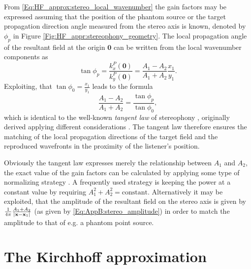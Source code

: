From \eqref{Eq:HF_approx:stereo_local_wavenumber} the gain factors may be expressed assuming that the position of the phantom source or the target propagation direction angle measured from the stereo axis is known, denoted by $\phi_p$ in Figure \eqref{Fig:HF_appr:stereophony_geometry}.
The local propagation angle of the resultant field at the origin $\mathbf{0}$ can be written from the local wavenumber components as
\begin{equation}
\tan \phi_p = \frac{k_x^P(\mathbf{0})}{k_y^P(\mathbf{0})} = \frac{A_1-A_2}{A_1+A_2}\frac{x_1}{y_1}.
\end{equation}
Exploiting, that $\tan \phi_0 = \frac{x_1}{y_1}$ leads to the formula
\begin{equation}
\frac{A_1 - A_2}{A_1 + A_2} = \frac{\tan \phi_p}{\tan \phi_0},
\end{equation}
which is identical to the well-known \emph{tangent law} of stereophony \cite{SpringerHandbookSpeech2008, Pulkki1997, Pulkki2001a, Pulkki2001:phd}, originally derived applying different considerations \cite{Bennett1985}.
The tangent law therefore ensures the matching of the local propagation directions of the target field and the reproduced wavefronts in the proximity of the listener's position.

Obviously the tangent law expresses merely the relationship between $A_1$ and $A_2$, the exact value of the gain factors can be calculated by applying some type of normalizing strategy \cite{Moore1990}.
A frequently used strategy is keeping the power at a constant value by requiring $A_1^2 + A_2^2 = \text{constant}$.
Alternatively it may be exploited, that the amplitude of the resultant field on the stereo axis is given by $\frac{1}{4\pi}\frac{A_1+A_2}{|\mathbf{x}-\mathbf{x}_1|}$ (as given by \eqref{Eq:AppB:stereo_amplitude}) in order to match the amplitude to that of e.g. a phantom point source.

\section{The Kirchhoff approximation}

